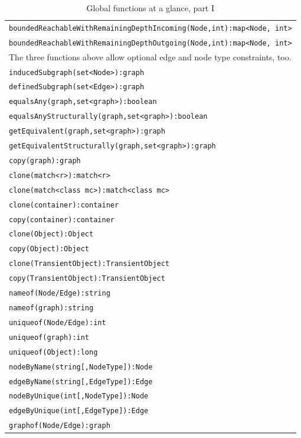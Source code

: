\begin{table}[htbp]
\begin{tabular}{|l|}
\texttt{boundedReachableWithRemainingDepthIncoming(Node,int):map<Node, int>}\\
\texttt{boundedReachableWithRemainingDepthOutgoing(Node,int):map<Node, int>}\\
The three functions above allow optional edge and node type constraints, too.\\
\hline
\texttt{inducedSubgraph(set<Node>):graph}\\
\texttt{definedSubgraph(set<Edge>):graph}\\
\texttt{equalsAny(graph,set<graph>):boolean}\\
\texttt{equalsAnyStructurally(graph,set<graph>):boolean}\\
\texttt{getEquivalent(graph,set<graph>):graph}\\
\texttt{getEquivalentStructurally(graph,set<graph>):graph}\\
\texttt{copy(graph):graph}\\
\texttt{clone(match<r>):match<r>}\\
\texttt{clone(match<class mc>):match<class mc>}\\
\texttt{clone(container):container}\\
\texttt{copy(container):container}\\
\texttt{clone(Object):Object}\\
\texttt{copy(Object):Object}\\
\texttt{clone(TransientObject):TransientObject}\\
\texttt{copy(TransientObject):TransientObject}\\
\hline
\texttt{nameof(Node/Edge):string}\\
\texttt{nameof(graph):string}\\
\texttt{uniqueof(Node/Edge):int}\\
\texttt{uniqueof(graph):int}\\
\texttt{uniqueof(Object):long}\\
\texttt{nodeByName(string[,NodeType]):Node}\\
\texttt{edgeByName(string[,EdgeType]):Edge}\\
\texttt{nodeByUnique(int[,NodeType]):Node}\\
\texttt{edgeByUnique(int[,EdgeType]):Edge}\\
\texttt{graphof(Node/Edge):graph}\\
\hline
\end{tabular}
\caption{Global functions at a glance, part I}
\label{funcstab}
\end{table}

